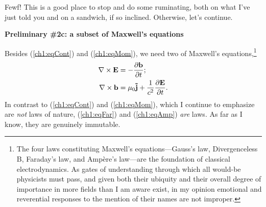 Fewf! This is a good place to stop and do some ruminating, both on what I've
just told you and on a sandwich, if so inclined. Otherwise, let's continue.

\textbf{Preliminary \#2c: a subset of Maxwell's equations}

Besides (\ref{ch1:eqCont}) and (\ref{ch1:eqMom}), we need two of Maxwell's
equations,\footnote{The four laws constituting Maxwell's equations---Gauss's
  law, Divergenceless B, Faraday's law, and Amp\`{e}re's law---are the
  foundation of classical electrodynamics. As gates of understanding through
  which all would-be physicists must pass, and given both their ubiquity and
  their overall degree of importance in more fields than I am aware exist, in my
  opinion emotional and reverential responses to the mention of their names are
  not improper.}
\begin{subequations}
  \begin{align} {\bf \nabla} \times \mathbf{E} &= - \dfrac{\partial \mathbf{b}}{\partial t}; \label{ch1:eqFar} \\
    {\bf \nabla} \times \mathbf{b} &= \mu_0 \mathbf{\tilde j} + \dfrac{1}{c^2} \dfrac{\partial \mathbf{E}}{\partial t}. \label{ch1:eqAmp}
  \end{align}
\end{subequations}
In contrast to (\ref{ch1:eqCont}) and (\ref{ch1:eqMom}), which I continue to
emphasize are \emph{not} laws of nature, (\ref{ch1:eqFar}) and (\ref{ch1:eqAmp})
\emph{are} laws. As far as I know, they are genuinely immutable.%

